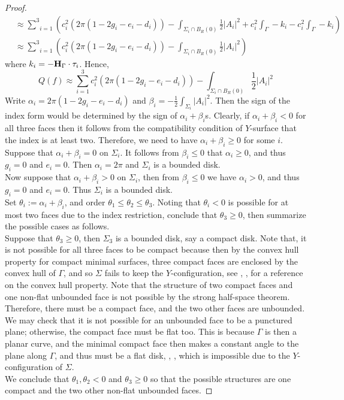 \documentclass[11pt]{amsart}
\numberwithin{equation}{section}
\theoremstyle{theorem}
\theoremstyle{definition}
\numberwithin{equation}{section}
\begin{document}
\begin{proof}
\begin{equation}
\begin{split}
&\approx \underset{i=1}{\overset{3}{\sum}}(c_i^2 (2\pi (1-2g_i-e_i-d_i))-\int_{\Sigma_i\cap B_R(0)} \frac{1}{2}\vert A_i\vert^2 +c_i^2\int_{\Gamma} -k_i -c_i^2\int_{\Gamma} -k_i )\\
&\approx \underset{i=1}{\overset{3}{\sum}}(c_i^2 (2\pi (1-2g_i-e_i-d_i))-\int_{\Sigma_i\cap B_R(0)} \frac{1}{2}\vert A_i\vert^2 )
\end{split}
\end{equation}
where $k_i=-\bold{H}_{\Gamma}\cdot \tau_i$. 
Hence,
\begin{equation}\label{eqn: Q(f), f=(c1,c2,c3)}
Q(f)\approx \underset{i=1}{\overset{3}{\sum}} c_i^2  (2\pi (1-2g_i-e_i-d_i))-\int_{\Sigma_i\cap B_R(0)}\frac{1}{2}\vert A_i\vert^2 
\end{equation}
Write $\alpha_i=2\pi(1-2g_i-e_i-d_i)$ and $\beta_i=-\frac{1}{2}\int_{\Sigma_i}\vert A_i\vert^2$. Then the sign of the index form would be determined by the sign of $\alpha_i+\beta_i$s. Clearly, if $\alpha_i+\beta_i<0$ for all three faces then it follows from the compatibility condition of $Y$-surface that the index is at least two. Therefore, we need to have $\alpha_i+\beta_i\geq 0$ for some $i$. \\
Suppose that $\alpha_i+\beta_i=0$ on $\Sigma_i$. It follows from $\beta_i \leq 0$ that $\alpha_i\geq 0$, and thus $g_i=0$ and $e_i=0$. Then $\alpha_i=2\pi$ and $\Sigma_i$ is a bounded disk.  \\
Now suppose that  $\alpha_i+\beta_i>0$ on $\Sigma_i$, then from $\beta_i\leq 0$ we have $\alpha_i >0$, and thus $g_i=0$ and $e_i=0$. Thus $\Sigma_i$ is a bounded disk.\\

Set $\theta_i:=\alpha_i+\beta_i$, and order $\theta_1 \leq \theta_2 \leq \theta_3$. Noting that $\theta_i<0$ is possible for at most two faces due to the index restriction, conclude that $\theta_3 \geq 0$, then summarize the possible cases as follows.\\
 Suppose that $\theta_3\geq0$, then $\Sigma_3$ is a bounded disk, say a compact disk. Note that, it is not possible for all three faces to be compact because then by the convex hull property for compact minimal surfaces, three compact faces are enclosed by the convex hull of $\Gamma$, and so $\Sigma$ fails to keep the $Y$-configuration, see \cite{colding2011course}, \cite{osserman1971convex}, for a reference on the convex hull property. Note that the structure of two compact faces and one non-flat unbounded face is not possible by the strong half-space theorem. Therefore, there must be a compact face, and the two other faces are unbounded. We may check that it is not possible for an unbounded face to be a punctured plane; otherwise, the compact face must be flat too. This is because $\Gamma$ is then a planar curve, and the minimal compact face then makes a constant angle to the plane along $\Gamma$, and thus must be a flat disk, \cite{nitsche1989lectures}, \cite{nitsche1965new}, which is impossible due to the $Y$-configuration of $\Sigma$. \\
We conclude that $\theta_1, \theta_2<0$ and $\theta_3\geq0$ so that the possible structures are one compact and the two other non-flat unbounded faces. 
\medskip


\end{proof}
\end{document}

